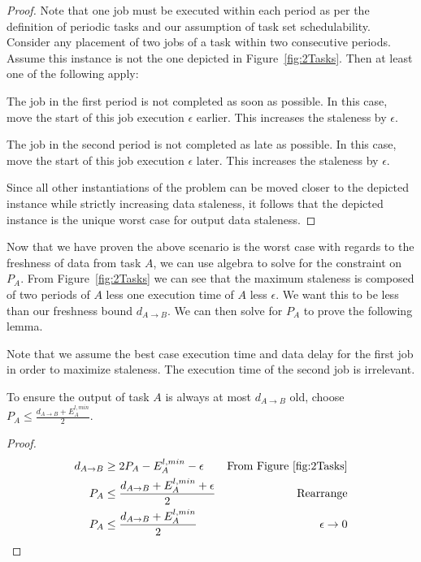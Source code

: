 \begin{proof}
	Note that one job must be executed within each period as per the definition of periodic tasks and our assumption of task set schedulability. Consider any placement of two jobs of a task within two consecutive periods. Assume this instance is not the one depicted in Figure~\ref{fig:2Tasks}. Then at least one of the following apply:
	\begin{case}
		The job in the first period is not completed as soon as possible. In this case, move the start of this job execution $\epsilon$ earlier. This increases the staleness by $\epsilon$.
	\end{case}
	\begin{case}
		The job in the second period is not completed as late as possible. In this case, move the start of this job execution $\epsilon$ later. This increases the staleness by $\epsilon$.
	\end{case}
	Since all other instantiations of the problem can be moved closer to the depicted instance while strictly increasing data staleness, it follows that the depicted instance is the unique worst case for output data staleness.
\end{proof}

Now that we have proven the above scenario is the worst case with regards to the freshness of data from task $A$, we can use algebra to solve for the constraint on $P_A$. From Figure~\ref{fig:2Tasks} we can see that the maximum staleness is composed of two periods of $A$ less one execution time of $A$ less $\epsilon$. We want this to be less than our freshness bound $d_{A \to B}$. We can then solve for $P_A$ to prove the following lemma.

Note that we assume the best case execution time and data delay for the first job in order to maximize staleness. The execution time of the second job is irrelevant.

\begin{lemma}
	\label{lem:2TaskResult}
	To ensure the output of task $A$ is always at most $d_{A \to B}$ old, choose $P_A \leq \frac{d_{A \to B} + E^{l,min}_A}{2}$.
\end{lemma}

\begin{proof}
	\begin{align*}
		d_{A \to B}&\geq 2P_A-E^{l,min}_A-\epsilon &\mbox{From Figure \ref{fig:2Tasks}}&\\
		P_A&\leq \frac{d_{A \to B} + E^{l,min}_A + \epsilon}{2} &\mbox{Rearrange}&\\
		P_A&\leq \frac{d_{A \to B} + E^{l,min}_A}{2} &\mbox{$\epsilon \to 0$}&
	\end{align*}
\end{proof}

